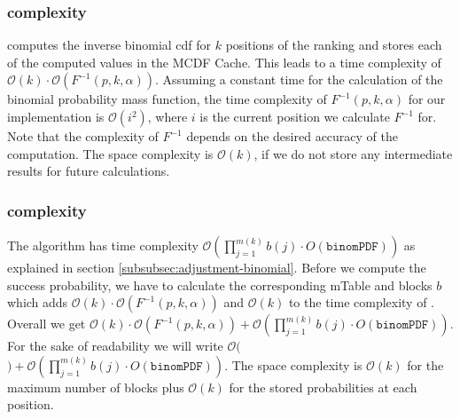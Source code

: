 \subsubsection{\algoMtable complexity}\label{subsubsec:construct-mtable-complexity}
\algoMtable computes the inverse binomial cdf for $k$ positions of the ranking and stores each of the computed values in the MCDF Cache.
%
This leads to a time complexity of $\mathcal{O}(k) \cdot \mathcal{O}(F^{-1}(p,k,\alpha))$.
%
Assuming a constant time for the calculation of the binomial probability mass function, the time complexity of $F^{-1}(p,k,\alpha)$ for our implementation is $\mathcal{O}(i^2)$, where $i$ is the current position we calculate $F^{-1}$ for.
%
Note that the complexity of $F^{-1}$ depends on the desired accuracy of the computation.
%
The space complexity is $\mathcal{O}(k)$, if we do not store any intermediate results for future calculations.
%
\begin{table}[b!]
	\caption{Time complexity for all algorithms for one protected group without pre-computed results.\label{tbl:time-space-binom}}
\end{table}

\subsubsection{\algoRecursive complexity}\label{subsubsec:success-prob-complexity}
The algorithm \algoRecursive has time complexity $\mathcal{O}(\prod_{j=1}^{m(k)}b(j) \cdot O(\texttt{binomPDF}))$ as explained in section \ref{subsubsec:adjustment-binomial}.
%
Before we compute the success probability, we have to calculate the corresponding mTable and blocks $b$ which adds $\mathcal{O}(k) \cdot \mathcal{O}(F^{-1}(p,k,\alpha))$ and $\mathcal{O}(k)$ to the time complexity of \algoRecursive.
%
Overall we get $\mathcal{O}(k) \cdot \mathcal{O}(F^{-1}(p,k,\alpha)) + \mathcal{O}(\prod_{j=1}^{m(k)}b(j) \cdot O(\texttt{binomPDF}))$.
%
For the sake of readability we will write $\mathcal{O}($\algoMtable$) + \mathcal{O}(\prod_{j=1}^{m(k)}b(j) \cdot O(\texttt{binomPDF}))$.
%
The space complexity is $\mathcal{O}(k)$ for the maximum number of blocks plus $\mathcal{O}(k)$ for the stored probabilities at each position.
%
